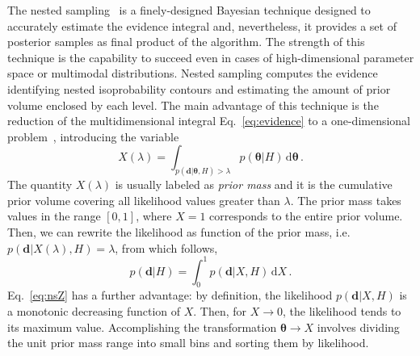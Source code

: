 \documentclass[prd,aps,twocolumn,a4paper,showkeys,nofootinbib,floatfix]{revtex4-1}
\newcommand{\be}{\begin{equation}}
\newcommand{\ee}{\end{equation}}
\def\params{\boldsymbol{\theta}}
\def\data{\textbf{d}}
\def\d{\text{d}}
\begin{document}
The nested sampling~\cite{Skilling:2006,Sivia2006} 
is a finely-designed 
Bayesian technique designed to accurately estimate the evidence integral
and, nevertheless, it provides a set of posterior samples as final product of the algorithm.
The strength of this technique is the capability to succeed even in cases of high-dimensional parameter space or multimodal distributions.
Nested sampling computes the evidence identifying nested isoprobability contours
and estimating the amount of prior volume enclosed by each level.
The main advantage of this technique is the reduction of 
the multidimensional integral Eq.~\eqref{eq:evidence} to a
one-dimensional problem~\cite{Chopin_2010,Betancourt_2011}, introducing the variable
\be
\label{eq:nsX}
X(\lambda) = \int_{p(\data|\params,H)>\lambda}p(\params|H) \,\d\params\,.
\ee
The quantity $X(\lambda)$ is usually labeled as {\it prior mass} 
and it is the cumulative prior volume covering all likelihood values greater than $\lambda$. 
The prior mass takes values in the range $[0,1]$, where
$X=1$ corresponds to the entire prior volume.
Then, we can rewrite the likelihood as function of the prior mass,
i.e. $p(\data|X(\lambda),H) = \lambda$, from which follows,
\be
\label{eq:nsZ}
p(\data|H)= \int_0^1 p(\data|X,H) \,\d X\,.
\ee
Eq.~\eqref{eq:nsZ} has a further advantage: 
by definition, the likelihood $p(\data|X,H)$
is a monotonic decreasing function of $X$.
Then, for $X\to 0$, the likelihood tends to its maximum value.
Accomplishing the transformation $\params \to X$ 
involves dividing the unit prior mass range into small bins and sorting them by likelihood.
\end{document}
